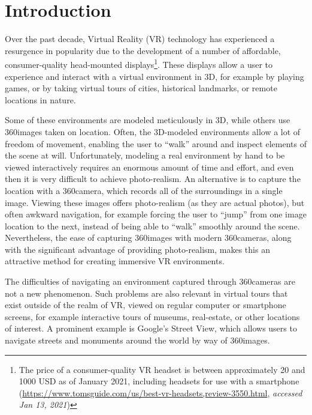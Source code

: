 \chapter{Introduction}

Over the past decade, Virtual Reality (VR) technology has experienced a resurgence in popularity due to the development of a number of affordable, consumer-quality head-mounted displays\footnote{The price of a consumer-quality VR headset is between approximately 20 and 1000 USD as of January 2021, including headsets for use with a smartphone (\url{https://www.tomsguide.com/us/best-vr-headsets,review-3550.html}, \emph{accessed Jan 13, 2021})}. These displays allow a user to experience and interact with a virtual environment in 3D, for example by playing games, or by taking virtual tours of cities, historical landmarks, or remote locations in nature.

Some of these environments are modeled meticulously in 3D, while others use 360\degree images taken on location. Often, the 3D-modeled environments allow a lot of freedom of movement, enabling the user to ``walk'' around and inspect elements of the scene at will. Unfortunately, modeling a real environment by hand to be viewed interactively requires an enormous amount of time and effort, and even then it is very difficult to achieve photo-realism. An alternative is to capture the location with a 360\degree camera, which records all of the surroundings in a single image. Viewing these images offers photo-realism (as they are actual photos), but often awkward navigation, for example forcing the user to ``jump'' from one image location to the next, instead of being able to ``walk'' smoothly around the scene. Nevertheless, the ease of capturing 360\degree images with modern 360\degree cameras, along with the significant advantage of providing photo-realism, makes this an attractive method for creating immersive VR environments.

The difficulties of navigating an environment captured through 360\degree cameras are not a new phenomenon. Such problems are also relevant in virtual tours that exist outside of the realm of VR, viewed on regular computer or smartphone screens, for example interactive tours of museums, real-estate, or other locations of interest. A prominent example is Google's Street View, which allows users to navigate streets and monuments around the world by way of 360\degree images.

